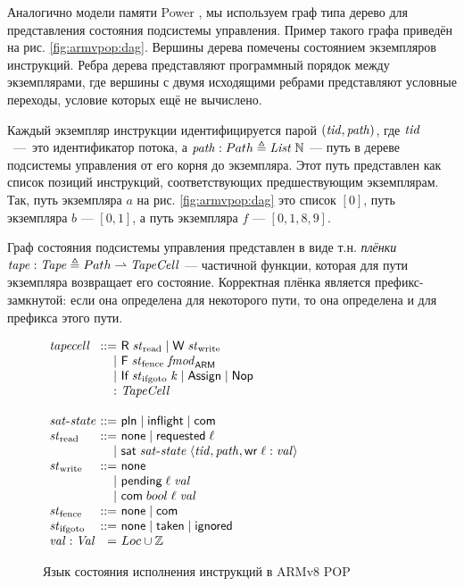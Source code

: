 Аналогично модели памяти Power \cite{Sarkar-al:PLDI11}, мы используем граф типа дерево
для представления состояния подсистемы управления.
Пример такого графа приведён на рис. \ref{fig:armvpop:dag}.
Вершины дерева помечены состоянием экземпляров инструкций.
Ребра дерева представляют программный порядок между экземплярами, где
вершины с двумя исходящими ребрами представляют условные переходы, условие
которых ещё не вычислено.

Каждый экземпляр инструкции идентифицируется парой $(\mathit{tid},\mathit{path})$,
где $\mathit{tid}$~---~это идентификатор потока,
а $\mathit{path} : Path \triangleq \mathit{List}\;{\mathbb{N}}$ --- путь в дереве подсистемы управления
от его корня до экземпляра. Этот путь представлен как список позиций инструкций, соответствующих
предшествующим экземплярам. Так, путь экземпляра $a$ на рис. \ref{fig:armvpop:dag} это
список $[0]$, путь экземпляра $b$ --- $[0,1]$, а путь экземпляра $f$ --- $[0,1,8,9]$.

Граф состояния подсистемы управления представлен в виде т.н. \emph{плёнки}
$\mathit{tape} : \mathit{Tape} \triangleq Path \rightharpoonup \mathit{TapeCell}$ --- частичной функции, которая для пути экземпляра
возвращает его состояние. Корректная плёнка является префикс-замкнутой: если она определена для
некоторого пути, то она определена и для префикса этого пути.

\begin{figure}
  \begin{center}
$\begin{array}{l @{~} r @{~} l}
\tapeCell & ::= & \tapeRead{\Rstate} \mid \tapeWrite{\Wstate} \\
          & |   & \tapeFence{\Fstate}{\Ftype} \\
          & |   & \tapeIfGoto{\IfState}{\z} \mid \tapeAssign \mid \tapeNop \\
          & :   & \TapeCell \\
\\
\satisfiedState & ::= & \Plain \mid \SatisfiedInFlight \mid \Committed \\
\Rstate & ::= & \None \mid \Issued{\loc} \\
        & |   & \tapeSatisfied{\satisfiedState}{\stRequestWrite{\tId}{\cpath}{\loc}{\stval}} \\
\Wstate   & ::= & \None \\
          & |   & \tapePending{\loc}{\stval} \\
         & |   & \tapeWriteCommitted{bool}{\loc}{\stval}\\
\Fstate  & ::= & \None \mid \Committed\\
\IfState & ::= & \None \mid \Taken \mid \Ignored \; \\
\stval   :  \Stval  &  = & \Loc \cup \mathbb{Z} \\
\end{array}$
  \end{center}
\caption{Язык состояния исполнения инструкций в ARMv8 POP}
\label{fig:tape-arm}
\end{figure}

